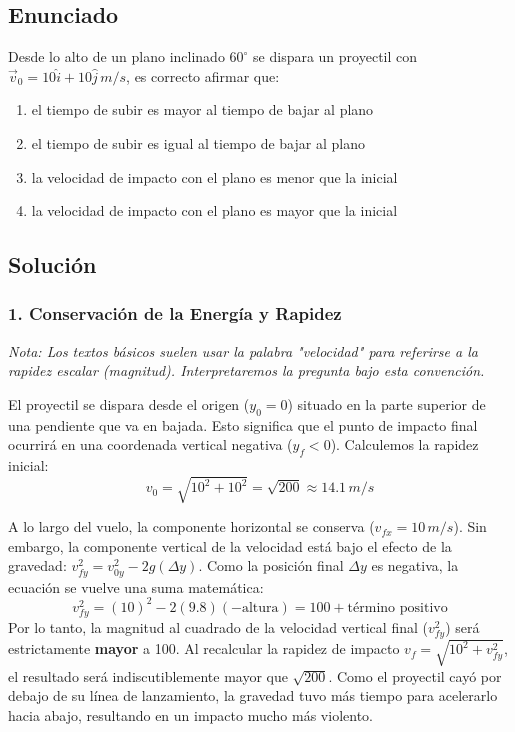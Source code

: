 \documentclass[12pt, a4paper]{article}
\begin{document}
\newpage

\subsection*{Enunciado}
Desde lo alto de un plano inclinado $60^\circ$ se dispara un proyectil con $\vec{v}_0 = 10\hat{i} + 10\hat{j} \,\si{m/s}$, es correcto afirmar que:
\begin{enumerate}[label=\alph*)]
    \item el tiempo de subir es mayor al tiempo de bajar al plano
    \item el tiempo de subir es igual al tiempo de bajar al plano
    \item la velocidad de impacto con el plano es menor que la inicial
    \item la velocidad de impacto con el plano es mayor que la inicial
\end{enumerate}

\subsection*{Solución}

\subsubsection*{1. Conservación de la Energía y Rapidez}
\textit{Nota: Los textos básicos suelen usar la palabra "velocidad" para referirse a la rapidez escalar (magnitud). Interpretaremos la pregunta bajo esta convención.}

El proyectil se dispara desde el origen ($y_0 = 0$) situado en la parte superior de una pendiente que va en bajada. Esto significa que el punto de impacto final ocurrirá en una coordenada vertical negativa ($y_f < 0$).
Calculemos la rapidez inicial:
$$ v_0 = \sqrt{10^2 + 10^2} = \sqrt{200} \approx 14.1\,\si{m/s} $$

A lo largo del vuelo, la componente horizontal se conserva ($v_{fx} = 10\,\si{m/s}$). 
Sin embargo, la componente vertical de la velocidad está bajo el efecto de la gravedad: $v_{fy}^2 = v_{0y}^2 - 2g(\Delta y)$.
Como la posición final $\Delta y$ es negativa, la ecuación se vuelve una suma matemática:
$$ v_{fy}^2 = (10)^2 - 2(9.8)(-\text{altura}) = 100 + \text{término positivo} $$
Por lo tanto, la magnitud al cuadrado de la velocidad vertical final ($v_{fy}^2$) será estrictamente \textbf{mayor} a 100.
Al recalcular la rapidez de impacto $v_f = \sqrt{10^2 + v_{fy}^2}$, el resultado será indiscutiblemente mayor que $\sqrt{200}$. Como el proyectil cayó por debajo de su línea de lanzamiento, la gravedad tuvo más tiempo para acelerarlo hacia abajo, resultando en un impacto mucho más violento.
\end{document}

